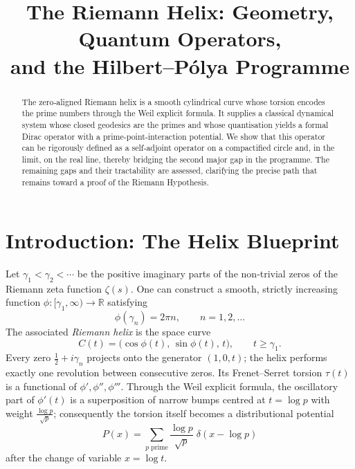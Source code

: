 \documentclass[12pt,a4paper]{article}
\title{\bf The Riemann Helix: Geometry, Quantum Operators,\\ and the Hilbert--P\'olya Programme}
\author{}
\date{}
\newcommand{\R}{\mathbb{R}}
\begin{document}
\maketitle

\begin{abstract}
The zero‑aligned Riemann helix is a smooth cylindrical curve whose torsion encodes the prime numbers through the Weil explicit formula.  It supplies a classical dynamical system whose closed geodesics are the primes and whose quantisation yields a formal Dirac operator with a prime‑point‑interaction potential.  We show that this operator can be rigorously defined as a self‑adjoint operator on a compactified circle and, in the limit, on the real line, thereby bridging the second major gap in the programme.  The remaining gaps and their tractability are assessed, clarifying the precise path that remains toward a proof of the Riemann Hypothesis.
\end{abstract}

\section{Introduction: The Helix Blueprint}

Let \(\gamma_1<\gamma_2<\cdots\) be the positive imaginary parts of the non‑trivial zeros of the Riemann zeta function \(\zeta(s)\).  One can construct a smooth, strictly increasing function \(\phi: [\gamma_1,\infty) \to \R\) satisfying
\[
\phi(\gamma_n) = 2\pi n,\qquad n = 1,2,\dots
\]
The associated \emph{Riemann helix} is the space curve
\[
C(t) = \bigl( \cos \phi(t),\, \sin \phi(t),\, t \bigr),\qquad t \ge \gamma_1 .
\]
Every zero \(\frac12 + i\gamma_n\) projects onto the generator \((1,0,t)\); the helix performs exactly one revolution between consecutive zeros.  Its Frenet–Serret torsion \(\tau(t)\) is a functional of \(\phi',\phi'',\phi'''\).  Through the Weil explicit formula, the oscillatory part of \(\phi'(t)\) is a superposition of narrow bumps centred at \(t = \log p\) with weight \(\frac{\log p}{\sqrt{p}}\); consequently the torsion itself becomes a distributional potential
\[
P(x) = \sum_{p\text{ prime}} \frac{\log p}{\sqrt{p}}\;\delta(x - \log p)
\]
after the change of variable \(x = \log t\).
\end{document}
